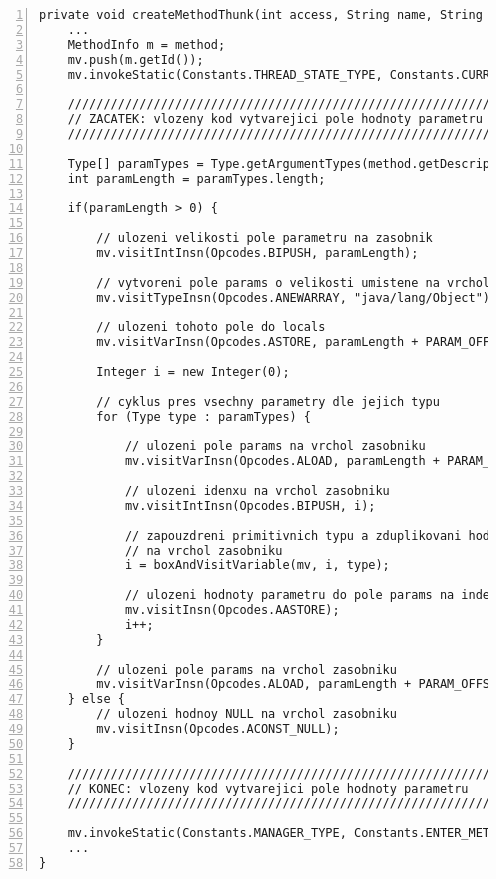 \begin{lstlisting}[frame=none, numbers=left, xleftmargin=1cm, label=opcode-1, caption=Upravená metoda createMethodThunk zajišťující vytvoření pole hodnot parametrů volané metody.]
private void createMethodThunk(int access, String name, String desc, String signature, String[] exceptions, String wrappedMethodName, int maxLocals) {
	...
	MethodInfo m = method;
	mv.push(m.getId());
	mv.invokeStatic(Constants.THREAD_STATE_TYPE, Constants.CURRENT_THREAD_METHOD);
	
	//////////////////////////////////////////////////////////////////////////////
	// ZACATEK: vlozeny kod vytvarejici pole hodnoty parametru
	//////////////////////////////////////////////////////////////////////////////
	
	Type[] paramTypes = Type.getArgumentTypes(method.getDescriptor());
	int paramLength = paramTypes.length;

	if(paramLength > 0) {
		
		// ulozeni velikosti pole parametru na zasobnik	
		mv.visitIntInsn(Opcodes.BIPUSH, paramLength);
		
		// vytvoreni pole params o velikosti umistene na vrcholu zasobniku
		mv.visitTypeInsn(Opcodes.ANEWARRAY, "java/lang/Object");
		
		// ulozeni tohoto pole do locals
		mv.visitVarInsn(Opcodes.ASTORE, paramLength + PARAM_OFFSET);

		Integer i = new Integer(0);
		
		// cyklus pres vsechny parametry dle jejich typu
		for (Type type : paramTypes) {
			
			// ulozeni pole params na vrchol zasobniku
			mv.visitVarInsn(Opcodes.ALOAD, paramLength + PARAM_OFFSET);
			
			// ulozeni idenxu na vrchol zasobniku
			mv.visitIntInsn(Opcodes.BIPUSH, i);
			
			// zapouzdreni primitivnich typu a zduplikovani hodnoty i-teho parametru
			// na vrchol zasobniku
			i = boxAndVisitVariable(mv, i, type);

			// ulozeni hodnoty parametru do pole params na index i 
			mv.visitInsn(Opcodes.AASTORE);
			i++;
		}
		
		// ulozeni pole params na vrchol zasobniku			
		mv.visitVarInsn(Opcodes.ALOAD, paramLength + PARAM_OFFSET);
	} else {
		// ulozeni hodnoy NULL na vrchol zasobniku
		mv.visitInsn(Opcodes.ACONST_NULL);
	}
	
	//////////////////////////////////////////////////////////////////////////////
	// KONEC: vlozeny kod vytvarejici pole hodnoty parametru
	//////////////////////////////////////////////////////////////////////////////
	
	mv.invokeStatic(Constants.MANAGER_TYPE, Constants.ENTER_METHOD);
	...
}
\end{lstlisting}


